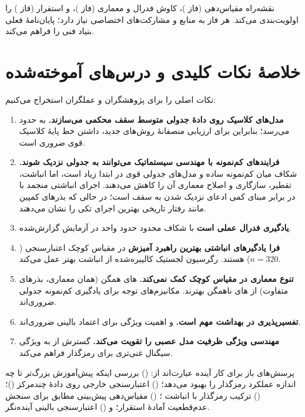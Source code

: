 نقشه‌راه مقیاس‌دهی (فاز )، کاوش فدرال و معماری (فاز )، و استقرار (فاز ) را اولویت‌بندی می‌کند. هر فاز به منابع و مشارکت‌های اختصاصی نیاز دارد؛ پایان‌نامۀ فعلی بنیاد فنی را فراهم می‌کند.

\section{خلاصۀ نکات کلیدی و درس‌های آموخته‌شده}

نکات اصلی را برای پژوهشگران و عملگران استخراج می‌کنیم:

\begin{enumerate}
\item \textbf{مدل‌های کلاسیک روی دادۀ جدولی متوسط سقف محکمی می‌سازند.}  به  حدود  می‌رسد؛ بنابراین برای ارزیابی منصفانۀ روش‌های جدید، داشتن خط پایۀ کلاسیک قوی ضروری است.
\item \textbf{فرایندهای کم‌نمونه با مهندسی سیستماتیک می‌توانند به  جدولی نزدیک شوند.} شکاف میان کم‌نمونه ساده و مدل‌های جدولی قوی در ابتدا زیاد است، اما انباشت، تقطیر، سازگاری و اصلاح معماری آن را کاهش می‌دهند. اجرای انباشتی منجمد با \textbf{} در برابر  \textbf{} مبنای کمی ادعای نزدیک شدن به سقف است؛ در حالی که بذرهای کمپین  مانند  رفتار تاریخی بهترین اجرای تکی را نشان می‌دهند.
\item \textbf{یادگیری فدرال عملی است} با شکاف محدود حدود  واحد  در آزمایش گزارش‌شده.
\item \textbf{فرا یادگیرهای انباشتی بهترین راهبرد آمیزش} در مقیاس کوچک اعتبارسنجی ($n=320$) هستند. رگرسیون لجستیک کالیبره‌شده از انباشت  بهتر عمل می‌کند.
\item \textbf{تنوع معماری در مقیاس کوچک کمک نمی‌کند.} های همگن (همان معماری، بذرهای متفاوت) از های ناهمگن بهترند. مکانیزم‌های توجه برای یادگیری کم‌نمونه جدولی ضروری‌اند.
\item \textbf{تفسیرپذیری در بهداشت مهم است.}  و اهمیت ویژگی برای اعتماد بالینی ضروری‌اند.
\item \textbf{مهندسی ویژگی ظرفیت مدل عصبی را تقویت می‌کند.} گسترش از  به  ویژگی سیگنال غنی‌تری برای رمزگذار فراهم می‌کند.
\end{enumerate}

پرسش‌های باز برای کار آینده عبارت‌اند از: () بررسی اینکه پیش‌آموزش بزرگ‌تر تا چه اندازه عملکرد رمزگذار  را بهبود می‌دهد؛ () اعتبارسنجی خارجی روی دادۀ چندمرکز ()؛ () ترکیب رمزگذار   با انباشت ؛ () مقیاس‌دهی پیش‌بینی مطابق برای سنجش عدم‌قطعیت آمادۀ استقرار؛ و () اعتبارسنجی بالینی آینده‌نگر.

